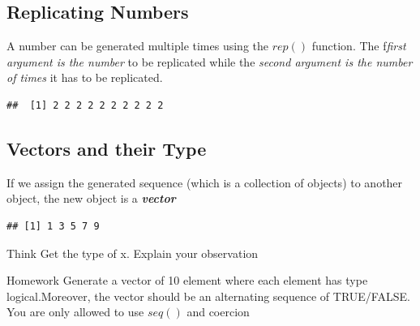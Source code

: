 \subsection{Replicating Numbers}
A number can be generated multiple times using the $rep()$ function. The f\emph{first argument is the number} to be replicated while the \emph{second argument is the number of times} it has to be replicated.
\begin{knitrout}
\color{fgcolor}\begin{kframe}
\begin{alltt}
\hlstd{(}\hlstd{,}\hlstd{)} 
\end{alltt}
\begin{verbatim}
##  [1] 2 2 2 2 2 2 2 2 2 2
\end{verbatim}
\end{kframe}
\end{knitrout}

\subsection{Vectors and their Type}
\noindent If we assign the generated sequence (which is a collection of objects) to another object, the new object is a \textbf{\emph{vector}}
\begin{knitrout}
\color{fgcolor}\begin{kframe}
\begin{alltt}
\hlkwb{<-}\hlstd{(}\hlstd{,}\hlstd{,}\hlstd{=}\hlstd{)} 
\end{alltt}
\begin{verbatim}
## [1] 1 3 5 7 9
\end{verbatim}
\end{kframe}
\end{knitrout}
\begin{DIY}{Think}
Get the type of x. Explain your observation
\end{DIY}

\begin{DIY}{Homework}
Generate a vector of 10 element where each element has type logical.Moreover, the vector should be an alternating sequence of TRUE/FALSE. You are only allowed to use $seq()$ and coercion
\end{DIY}

